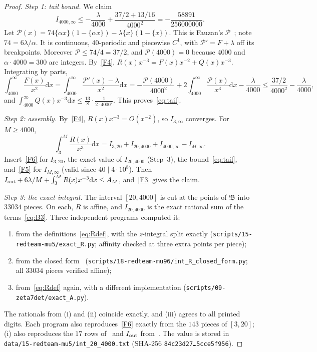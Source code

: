 \documentclass[11pt]{article}
\theoremstyle{remark}
\newcommand{\dd}{\mathrm{d}}
\newcommand{\file}[1]{\texttt{#1}}
\begin{document}
\begin{proof}
\emph{Step 1: tail bound.} We claim
\begin{equation}\label{eq:tail}
I_{4000,\infty}\le-\frac{\lambda}{4000}+\frac{37/2+13/16}{4000^2}=-\frac{58891}{256000000}.
\end{equation}
Let $\mathcal P(x)=74\{\alpha x\}(1-\{\alpha x\})-\lambda\{x\}(1-\{x\})$. This is Fauzan's $\mathcal P$~\cite[p.~16]{F}; note $74=6\lambda/\alpha$. It is continuous, $40$-periodic and piecewise $C^1$, with $\mathcal P'=F+\lambda$ off its breakpoints. Moreover $\mathcal P\le74/4=37/2$, and $\mathcal P(4000)=0$ because $4000$ and $\alpha\cdot4000=300$ are integers. By~\ref{F4}, $R(x)x^{-3}=F(x)x^{-2}+Q(x)x^{-3}$. Integrating by parts,
\[
\int_{4000}^\infty\frac{F(x)}{x^2}\dd x=\int_{4000}^\infty\frac{\mathcal P'(x)-\lambda}{x^2}\dd x=-\frac{\mathcal P(4000)}{4000^2}+2\int_{4000}^\infty\frac{\mathcal P(x)}{x^3}\dd x-\frac{\lambda}{4000}\le\frac{37/2}{4000^2}-\frac{\lambda}{4000},
\]
and $\int_{4000}^\infty Q(x)x^{-3}\dd x\le\frac{13}8\cdot\frac1{2\cdot4000^2}$. This proves~\eqref{eq:tail}.

\emph{Step 2: assembly.} By~\ref{F4}, $R(x)x^{-3}=O(x^{-2})$, so $I_{3,\infty}$ converges. For $M\ge4000$,
\[
\int_3^M\frac{R(x)}{x^3}\dd x=I_{3,20}+I_{20,4000}+I_{4000,\infty}-I_{M,\infty}.
\]
Insert~\ref{F6} for $I_{3,20}$, the exact value of $I_{20,4000}$ (Step~3), the bound~\eqref{eq:tail}, and~\ref{F5} for $I_{M,\infty}$ (valid since $40\mid4\cdot10^8$). Then $I_{\rm out}+6\lambda/M+\int_3^MR(x)x^{-3}\dd x\le A_M$, and~\ref{F3} gives the claim.

\emph{Step 3: the exact integral.} The interval $[20,4000]$ is cut at the points of $\mathfrak B$ into $33034$ pieces. On each, $R$ is affine, and $I_{20,4000}$ is the exact rational sum of the terms~\eqref{eq:B3}. Three independent programs computed it:
\begin{enumerate}[label=(\roman*)]
\item from the definitions~\eqref{eq:Rdef}, with the $z$-integral split exactly (\file{scripts/15-redteam-mu5/exact\_R.py}; affinity checked at three extra points per piece);
\item from the closed form~\cite[(5.12)--(5.13), (B.1)]{F} (\file{scripts/18-redteam-mu96/int\_R\_closed\_form.py}; all $33034$ pieces verified affine);
\item from~\eqref{eq:Rdef} again, with a different implementation (\file{scripts/09-zeta7det/exact\_A.py}).
\end{enumerate}
The rationals from (i) and (ii) coincide exactly, and (iii) agrees to all printed digits. Each program also reproduces~\ref{F6} exactly from the $143$ pieces of $[3,20]$; (i) also reproduces the $17$ rows of~\cite[Table~3]{F} and $I_{\rm out}$ from~\cite[(5.8)--(5.10)]{F}. The value is stored in \file{data/15-redteam-mu5/int\_20\_4000.txt} (SHA-256 \file{84c23d27\ldots5cce5f956}).
\end{proof}
\end{document}
